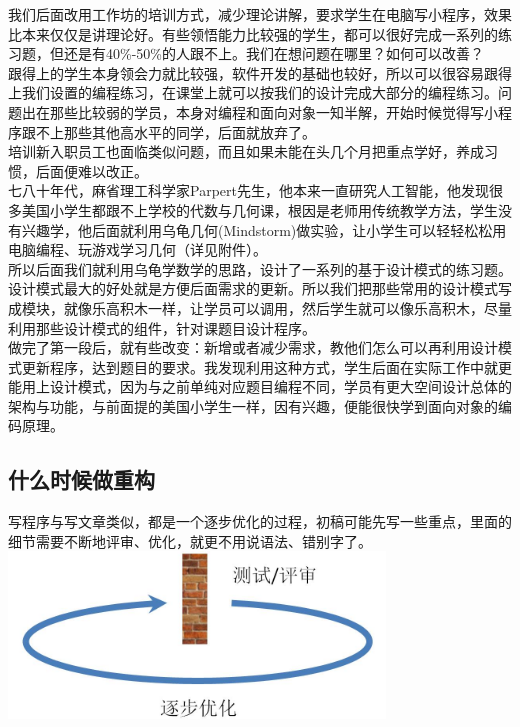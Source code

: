 我们后面改用工作坊的培训方式，减少理论讲解，要求学生在电脑写小程序，效果比本来仅仅是讲理论好。有些领悟能力比较强的学生，都可以很好完成一系列的练习题，但还是有40\%-50\%的人跟不上。我们在想问题在哪里？如何可以改善？\\
跟得上的学生本身领会力就比较强，软件开发的基础也较好，所以可以很容易跟得上我们设置的编程练习，在课堂上就可以按我们的设计完成大部分的编程练习。问题出在那些比较弱的学员，本身对编程和面向对象一知半解，开始时候觉得写小程序跟不上那些其他高水平的同学，后面就放弃了。\\
培训新入职员工也面临类似问题，而且如果未能在头几个月把重点学好，养成习惯，后面便难以改正。\\
七八十年代，麻省理工科学家Parpert先生，他本来一直研究人工智能，他发现很多美国小学生都跟不上学校的代数与几何课，根因是老师用传统教学方法，学生没有兴趣学，他后面就利用乌龟几何(Mindstorm)做实验，让小学生可以轻轻松松用电脑编程、玩游戏学习几何（详见附件）。\\
所以后面我们就利用乌龟学数学的思路，设计了一系列的基于设计模式的练习题。设计模式最大的好处就是方便后面需求的更新。所以我们把那些常用的设计模式写成模块，就像乐高积木一样，让学员可以调用，然后学生就可以像乐高积木，尽量利用那些设计模式的组件，针对课题目设计程序。\\
做完了第一段后，就有些改变：新增或者减少需求，教他们怎么可以再利用设计模式更新程序，达到题目的要求。我发现利用这种方式，学生后面在实际工作中就更能用上设计模式，因为与之前单纯对应题目编程不同，学员有更大空间设计总体的架构与功能，与前面提的美国小学生一样，因有兴趣，便能很快学到面向对象的编码原理。\\

\hypertarget{ux4ec0ux4e48ux65f6ux5019ux505aux91cdux6784}{%
\subsection{什么时候做重构}\label{ux4ec0ux4e48ux65f6ux5019ux505aux91cdux6784}}

写程序与写文章类似，都是一个逐步优化的过程，初稿可能先写一些重点，里面的细节需要不断地评审、优化，就更不用说语法、错别字了。\\

\includegraphics[width=10cm]{环形图1.jpg}

